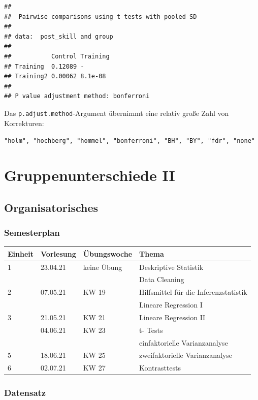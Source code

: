 \documentclass[
]{book}
\begin{document}
\begin{verbatim}
## 
##  Pairwise comparisons using t tests with pooled SD 
## 
## data:  post_skill and group 
## 
##           Control Training
## Training  0.12089 -       
## Training2 0.00062 8.1e-08 
## 
## P value adjustment method: bonferroni
\end{verbatim}

Das \texttt{p.adjust.method}-Argument übernimmt eine relativ große Zahl von Korrekturen:

\texttt{"holm",\ "hochberg",\ "hommel",\ "bonferroni",\ "BH",\ "BY",\ "fdr",\ "none"}

\hypertarget{gruppenunterschiede-ii}{%
\chapter{Gruppenunterschiede II}\label{gruppenunterschiede-ii}}

\hypertarget{organisatorisches-4}{%
\section{Organisatorisches}\label{organisatorisches-4}}

\hypertarget{semesterplan-5}{%
\subsection{Semesterplan}\label{semesterplan-5}}

\begin{tabular}[t]{llll}
\toprule
Einheit & Vorlesung & Übungswoche & Thema\\
\midrule
1 & 23.04.21 & keine Übung & Deskriptive Statistik\\
 &  &  & Data Cleaning\\
2 & 07.05.21 & KW 19 & Hilfsmittel für die Inferenzstatistik\\
 &  &  & Lineare Regression I\\
3 & 21.05.21 & KW 21 & Lineare Regression II\\
\addlinespace
4 & 04.06.21 & KW 23 & t- Tests\\
 &  &  & einfaktorielle Varianzanalyse\\
5 & 18.06.21 & KW 25 & zweifaktorielle Varianzanalyse\\
6 & 02.07.21 & KW 27 & Kontrasttests\\
\bottomrule
\end{tabular}

\hypertarget{datensatz-3}{%
\subsection{Datensatz}\label{datensatz-3}}
\end{document}
